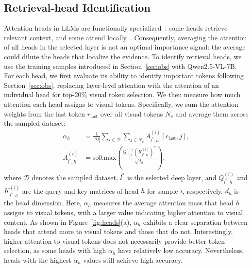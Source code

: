 \subsection{Retrieval-head Identification}
\label{sec:heads}
Attention heads in LLMs are functionally specialized~\cite{hawk,vera,baek2025large,park2026retrieval}: some heads retrieve relevant context, and some attend locally~\cite{duo}. Consequently, averaging the attention of all heads in the selected layer is not an optimal importance signal: the average could dilute the heads that localize the evidence. 
To identify retrieval heads, we use the training samples introduced in Section~\ref{sec:obs} with Qwen2.5-VL-7B. For each head, we first evaluate its ability to identify important tokens following Section~\ref{sec:obs}, replacing layer-level attention with the attention of an individual head for top-20\% visual token selection. We then measure how much attention each head assigns to visual tokens. Specifically, we sum the attention weights from the last token $r_{\mathrm{last}}$ over all visual tokens $N_v$ and average them across the sampled dataset:
\begin{align}
\alpha_h &= \frac{1}{|\mathcal{D}|}
\sum_{i\in\mathcal{D}}\sum_{j\in N_v}
A_{l^*,h}^{(i)}[r_{\mathrm{last}}, j], \\
A_{l^*,h}^{(i)} &=
\mathrm{softmax}\left(
\frac{Q_{l^*,h}^{(i)}(K_{l^*,h}^{(i)})^\top}
{\sqrt{d_h}}
\right),
\end{align}
where $\mathcal{D}$ denotes the sampled dataset, $l^*$ is the selected deep layer, and $Q_{l^*,h}^{(i)}$ and $K_{l^*,h}^{(i)}$ are the query and key matrices of head $h$ for sample $i$, respectively. $d_h$ is the head dimension. Here, $\alpha_h$ measures the average attention mass that head $h$ assigns to visual tokens, with a larger value indicating higher attention to visual content.
As shown in Figure~\ref{fig:heads}(a), $\alpha_h$ exhibits a clear separation between heads that attend more to visual tokens and those that do not. Interestingly, higher attention to visual tokens does not necessarily provide better token selection, as some heads with high $\alpha_h$ have relatively low accuracy. Nevertheless, heads with the highest $\alpha_h$ values still achieve high accuracy.

